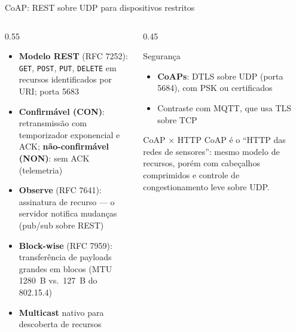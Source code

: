 \documentclass[aspectratio=169,11pt]{beamer}
\begin{document}
\begin{frame}{CoAP: REST sobre UDP para dispositivos restritos}
  \begin{columns}
    \begin{column}{0.55\textwidth}
      \begin{itemize}
        \item \textbf{Modelo REST} (RFC 7252): \texttt{GET}, \texttt{POST}, \texttt{PUT}, \texttt{DELETE} em recursos identificados por URI; porta 5683
        \item \textbf{Confirmável (CON)}: retransmissão com temporizador exponencial e ACK; \textbf{não-confirmável (NON)}: sem ACK (telemetria)
        \item \textbf{Observe} (RFC 7641): assinatura de recurso --- o servidor notifica mudanças (pub/sub sobre REST)
        \item \textbf{Block-wise} (RFC 7959): transferência de payloads grandes em blocos (MTU 1280~B vs.\ 127~B do 802.15.4)
        \item \textbf{Multicast} nativo para descoberta de recursos
      \end{itemize}
    \end{column}
    \begin{column}{0.45\textwidth}
      \begin{block}{Segurança}
        \begin{itemize}
          \item \textbf{CoAPs}: DTLS sobre UDP (porta 5684), com PSK ou certificados
          \item Contraste com MQTT, que usa TLS sobre TCP
        \end{itemize}
      \end{block}
      \pause
      \begin{exampleblock}{CoAP $\times$ HTTP}
        CoAP é o ``HTTP das redes de sensores'': mesmo modelo de recursos, porém com cabeçalhos comprimidos e controle de congestionamento leve sobre UDP.
      \end{exampleblock}
    \end{column}
  \end{columns}
\end{frame}
\end{document}
